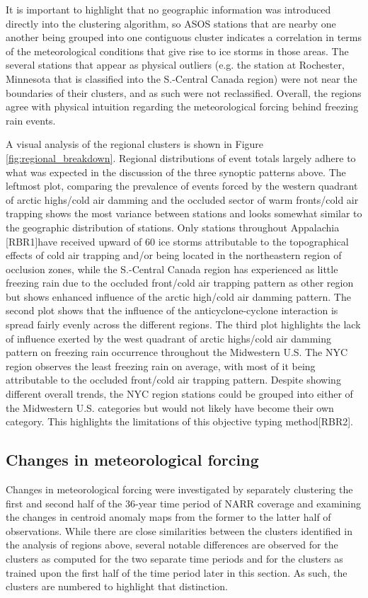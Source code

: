 \documentclass[twocol]{ametsoc}
\begin{document}
It is important to highlight that no geographic information was introduced directly into the clustering algorithm, so ASOS stations that are nearby one another being grouped into one contiguous cluster indicates a correlation in terms of the meteorological conditions that give rise to ice storms in those areas. The several stations that appear as physical outliers (e.g. the station at Rochester, Minnesota that is classified into the S.-Central Canada region) were not near the boundaries of their clusters, and as such were not reclassified. Overall, the regions agree with physical intuition regarding the meteorological forcing behind freezing rain events. 

A visual analysis of the regional clusters is shown in Figure \ref{fig:regional_breakdown}. Regional distributions of event totals largely adhere to what was expected in the discussion of the three synoptic patterns above. The leftmost plot, comparing the prevalence of events forced by the western quadrant of arctic highs/cold air damming and the occluded sector of warm fronts/cold air trapping shows the most variance between stations and looks somewhat similar to the geographic distribution of stations. Only stations throughout Appalachia [RBR1]have received upward of 60 ice storms attributable to the topographical effects of cold air trapping and/or being located in the northeastern region of occlusion zones, while the S.-Central Canada region has experienced as little freezing rain due to the occluded front/cold air trapping pattern as other region but shows enhanced influence of the arctic high/cold air damming pattern. The second plot shows that the influence of the anticyclone-cyclone interaction is spread fairly evenly across the different regions. The third plot highlights the lack of influence exerted by the west quadrant of arctic highs/cold air damming pattern on freezing rain occurrence throughout the Midwestern U.S. The NYC region observes the least freezing rain on average, with most of it being attributable to the occluded front/cold air trapping pattern. Despite showing different overall trends, the NYC region stations could be grouped into either of the Midwestern U.S. categories but would not likely have become their own category. This highlights the limitations of this objective typing method[RBR2].
 

\subsection{Changes in meteorological forcing}
Changes in meteorological forcing were investigated by separately clustering the first and second half of the 36-year time period of NARR coverage and examining the changes in centroid anomaly maps from the former to the  latter half of observations. While there are close similarities between the clusters identified in the analysis of regions above, several notable differences are observed for the clusters as computed for the two separate time periods and for the clusters as trained upon the first half of the time period later in this section. As such, the clusters are numbered to highlight that distinction.
\end{document}
